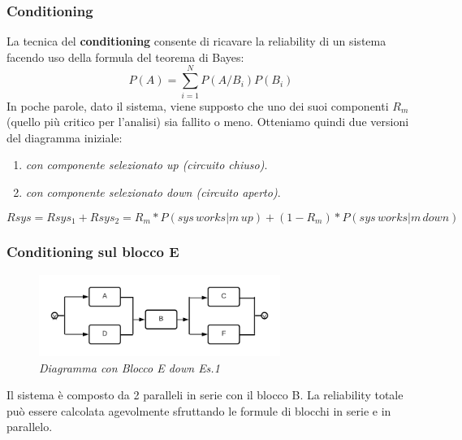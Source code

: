 \subsubsection{Conditioning}
La tecnica del \textbf{conditioning} consente di ricavare la reliability di un sistema facendo uso della formula del teorema di Bayes:
\begin{equation*}
	P(A) = \sum_{i = 1}^{N}P(A/B_i)P(B_i)
\end{equation*}
In poche parole, dato il sistema, viene supposto che uno dei suoi componenti $R_m$ (quello più critico per l'analisi) sia fallito o meno. Otteniamo quindi due versioni del diagramma iniziale:
\begin{enumerate}
	\item \textit{con componente selezionato up (circuito chiuso)}.
	\item \textit{con componente selezionato down (circuito aperto)}.
\end{enumerate}
\begin{equation*}
	Rsys = Rsys_1 + Rsys_2 = R_m*P(sys\,works|m\,up) + (1 - R_m)*P(sys\,works|m\,down)
\end{equation*}
\subsubsection{Conditioning sul blocco E}
\begin{figure}[H]
	\centering
	\includegraphics[width=0.7\textwidth]{img/hw5/e_down.png}
	\caption{\textit{Diagramma con Blocco E down Es.1}}
\end{figure}
Il sistema è composto da 2 paralleli in serie con il blocco B. La reliability totale può essere calcolata agevolmente sfruttando le formule di blocchi in serie e in parallelo.


